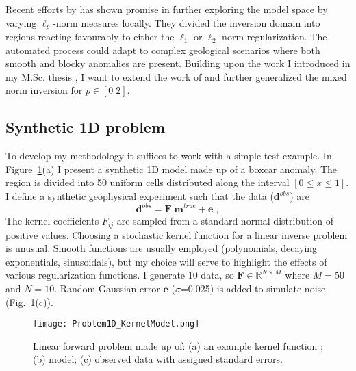 Recent efforts by \cite{SunLi14} has shown promise in further exploring the model space by varying $\ell_p$-norm measures locally. They divided the inversion domain into regions reacting favourably to either the $\ell_1$ or $\ell_2$-norm regularization. The automated process could adapt to complex geological scenarios where both smooth and blocky anomalies are present.
Building upon the work I introduced in my M.Sc. thesis \cite[]{Fournier2015}, I want to extend the work of \cite{SunLi14} and further generalized the mixed norm inversion for $p \in [0\;2]$.

\subsection{Synthetic 1D problem}
To develop my methodology it suffices to work with a simple test example.
In Figure~\ref{Problem1D}(a) I present a synthetic 1D model made up of a boxcar anomaly. The region is divided into 50 uniform cells distributed along the interval $[0 \le x \le 1]$. I define a synthetic geophysical experiment such that the data ($\mathbf{d}^{obs}$) are
\begin{equation}\label{Forward_Noisy}
\mathbf{d}^{obs} = \mathbf{F\;m}^{true} + \mathbf{e} \;,
\end{equation}
The kernel coefficients ${F}_{ij}$ are sampled from a standard normal distribution of positive values. Choosing a stochastic kernel function for a linear inverse problem is unusual. Smooth functions are usually employed (polynomials, decaying exponentials, sinusoidals), but my choice will serve to highlight the effects of various regularization functions. I generate 10 data, so $\mathbf{F}\in \mathbb{R}^{N \times M}$ where $M=50$ and $N=10$. Random Gaussian error $\mathbf{e}$ ($\sigma$=0.025) is added to simulate noise (Fig.~\ref{Problem1D}(c)).
\begin{figure}
\texttt{[image: Problem1D\_KernelModel.png]}
\caption{Linear forward problem made up of: (a) an example kernel function ; (b) model; (c) observed data with assigned standard errors.}
\label{Problem1D}
\end{figure}

